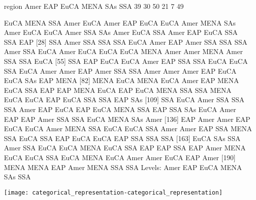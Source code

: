 \begin{Schunk}
\begin{Soutput}
region
Amer  EAP EuCA MENA  SAs  SSA 
  39   30   50   21    7   49 
\end{Soutput}
\begin{Soutput}
  [1] EuCA MENA SSA  Amer EuCA Amer EAP  EuCA EuCA Amer MENA SAs  Amer EuCA EuCA Amer SSA  SAs  Amer EuCA SSA  Amer EAP  EuCA SSA  SSA  EAP 
 [28] SSA  Amer SSA  SSA  SSA  EuCA Amer EAP  Amer SSA  SSA  SSA  Amer SSA  EuCA Amer EuCA EuCA EuCA MENA Amer Amer MENA Amer SSA  SSA  EuCA
 [55] SSA  EAP  EuCA EuCA Amer EAP  SSA  SSA  EuCA EuCA SSA  EuCA Amer Amer EAP  Amer SSA  SSA  Amer Amer Amer EAP  EuCA EuCA SAs  EAP  MENA
 [82] MENA EuCA MENA EuCA Amer EAP  MENA EuCA SSA  EAP  EAP  MENA EuCA EAP  EuCA MENA SSA  SSA  MENA EuCA EuCA EAP  EuCA SSA  SSA  EAP  SAs 
[109] SSA  EuCA Amer SSA  SSA  SSA  Amer EAP  EuCA EAP  EuCA MENA SSA  EAP  SSA  SAs  EuCA Amer EAP  EAP  Amer SSA  SSA  EuCA MENA SAs  Amer
[136] EAP  Amer Amer EAP  EuCA EuCA Amer MENA SSA  EuCA EuCA SSA  Amer Amer EAP  SSA  MENA SSA  EuCA SSA  EAP  EuCA EuCA EAP  SSA  SSA  SSA 
[163] EuCA SAs  SSA  Amer SSA  EuCA EuCA MENA EuCA SSA  EAP  EAP  SSA  EAP  Amer MENA EuCA EuCA SSA  EuCA MENA EuCA Amer Amer EuCA EAP  Amer
[190] MENA MENA EAP  Amer MENA SSA  SSA 
Levels: Amer EAP EuCA MENA SAs SSA
\end{Soutput}
\end{Schunk}
\texttt{[image: categorical\_representation-categorical\_representation]}
